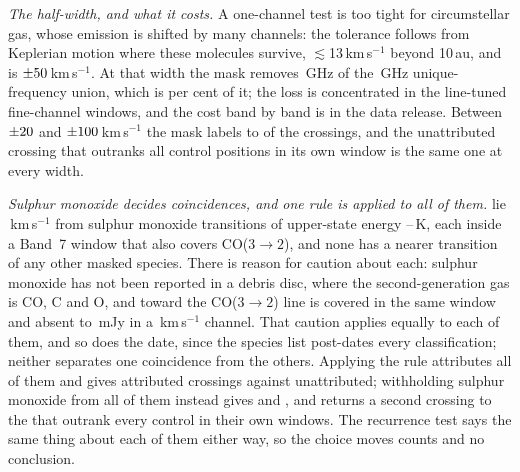 \emph{The half-width, and what it costs.} A one-channel test is too tight for
circumstellar gas, whose emission is shifted by many channels: the tolerance
follows from Keplerian motion where these molecules survive,
$\lesssim$13\,km\,s$^{-1}$ beyond 10\,au, and is
$\pm50$\,km\,s$^{-1}$. At that width the mask removes
\FrMaskLostGHz\,GHz of the \FrMaskUnionGHz\,GHz unique-frequency union, which
is \FrMaskPct{} per cent of it; the loss is concentrated in the line-tuned
fine-channel windows, and the cost band by band is in the data release.
Between $\pm20$ and $\pm100$\,km\,s$^{-1}$ the mask labels
\FrAttrWTwenty{} to \FrAttrWHundred{} of the \NCross{} crossings, and the
\FrNRankPass{} unattributed crossing that outranks all \NCtrl{} control
positions in its own window is the same one at every width.

\begin{table}
\centering
\footnotesize
\caption{The line mask, by species: the number of transitions $N$ it holds,
the frequency range they span inside the searched intervals and their
upper-state energies. Hydrogen recombination lines carry no tabulated
$E_{\rm u}$. The transition-by-transition list is in the data release.}
\label{tab:masklines}

\end{table}

\emph{Sulphur monoxide decides \MkNSODecideWord{} coincidences, and one rule is
applied to all of them.} \MkSOStars{} lie \MkSODvList\,km\,s$^{-1}$ from sulphur monoxide
transitions of upper-state energy \MkSOEuLo--\MkSOEuHi\,K, each inside a
Band~7 window that also covers CO($3\to2$), and none has a nearer transition
of any other masked species. There is reason for caution about each:
sulphur monoxide has not been reported in a debris disc, where the
second-generation gas is CO, C and O, and toward \FrCpStar{} the CO($3\to2$)
line is covered in the same window and absent to \FrCpCoLimMJy\,mJy in a
\FrCpCoChanKms\,km\,s$^{-1}$ channel. That caution applies equally to each of
them, and so does the date, since the species list post-dates every
classification; neither separates one coincidence from the others. Applying
the rule attributes all of them and gives \MkAttrSO{} attributed crossings
against \MkUnattrSO{} unattributed; withholding sulphur monoxide from all of
them instead gives \MkAttrNoSO{} and \MkUnattrNoSO, and returns a second
crossing to the \MkRankNoSO{} that outrank every control in their own
windows. The
recurrence test says the same thing about each of them either way, so the choice
moves counts and no conclusion.

